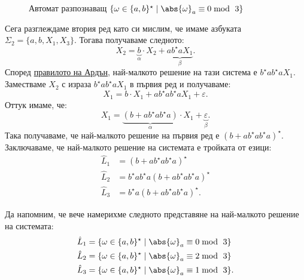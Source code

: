 \begin{example}
  \begin{figure}[H]
    \centering
    \caption{Автомат разпознаващ $\{\omega \in \{a,b\}^\star \mid \abs{\omega}_{a} \equiv 0 \bmod\ 3\}$}
  \end{figure}
  
  Сега разглеждаме втория ред като си мислим, че имаме азбуката $\Sigma_2 = \{a,b,X_1,X_3\}$. Тогава получаваме следното:
  \[X_2 = \underbrace{b}_{\alpha} \cdot X_2 + \underbrace{a b^\star a X_1}_{\beta}.\]
  Според \hyperref[prob:reg:arden]{правилото на Ардън}, най-малкото решение на тази система е $b^\star a b^\star a X_1$.
  Заместваме $X_2$ с израза $b^\star a b^\star a X_1$ в първия ред и получаваме:
  \[X_1 = b \cdot X_1 + ab^\star a b^\star a X_1  + \varepsilon.\]
  Оттук имаме, че:
  \[X_1 = \underbrace{(b + ab^\star a b^\star a)}_{\alpha} \cdot X_1 + \underbrace{\varepsilon}_{\beta}.\]
  Така получаваме, че най-малкото решение на първия ред е $(b + ab^\star a b^\star a)^\star$.
  Заключаваме, че най-малкото решение на системата е тройката от езици:
  \begin{align*}
    \hat{L}_1 & = (b + ab^\star a b^\star a)^\star\\
    \hat{L}_2 & = b^\star a b^\star a (b + ab^\star a b^\star a)^\star\\
    \hat{L}_3 & = b^\star a (b + ab^\star a b^\star a)^\star.
  \end{align*}
  
  Да напомним, че вече намерихме следното представяне на най-малкото решение на системата:
  \begin{align*}
    \hat{L}_1 & = \{\omega \in \{a,b\}^\star \mid \abs{\omega}_{a} \equiv 0 \bmod\ 3\}\\
    \hat{L}_2 & = \{\omega \in \{a,b\}^\star \mid \abs{\omega}_{a} \equiv 2 \bmod\ 3\}\\
    \hat{L}_3 & = \{\omega \in \{a,b\}^\star \mid \abs{\omega}_{a} \equiv 1 \bmod\ 3\}.
  \end{align*}
\end{example}
